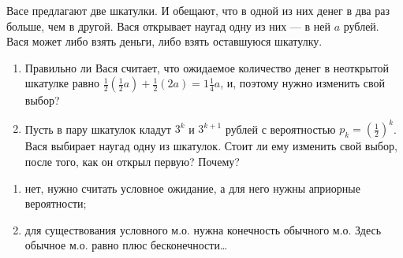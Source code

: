 



\begin{problem}\par
\begin{source}
\cite{binmore:fg}
\end{source}
Васе предлагают две шкатулки. И обещают, что в одной из них денег в два раз больше, чем в другой. Вася открывает наугад одну из них — в ней $a$  рублей. Вася может либо взять деньги, либо взять оставшуюся шкатулку.
\begin{enumerate}
\item Правильно ли Вася считает, что ожидаемое количество денег в неоткрытой шкатулке равно  $\frac{1}{2} \left(\frac{1}{2} a\right)+\frac{1}{2} \left(2a\right)=1\frac{1}{4} a$, и, поэтому нужно изменить свой выбор?\par
\item Пусть в пару шкатулок кладут  $3^{k} $  и  $3^{k+1} $  рублей с вероятностью  $p_{k} =\left(\frac{1}{2} \right)^{k} $. Вася выбирает наугад одну из шкатулок. Стоит ли ему изменить свой выбор, после того, как он открыл первую? Почему?\par
\end{enumerate}


\begin{sol}
\begin{enumerate}
\item
 нет, нужно считать условное ожидание, а для него нужны априорные вероятности;
 \item для существования условного м.о. нужна конечность обычного м.о. Здесь обычное м.о. равно плюс бесконечности\ldots
\end{enumerate}
\end{sol}
\end{problem}





